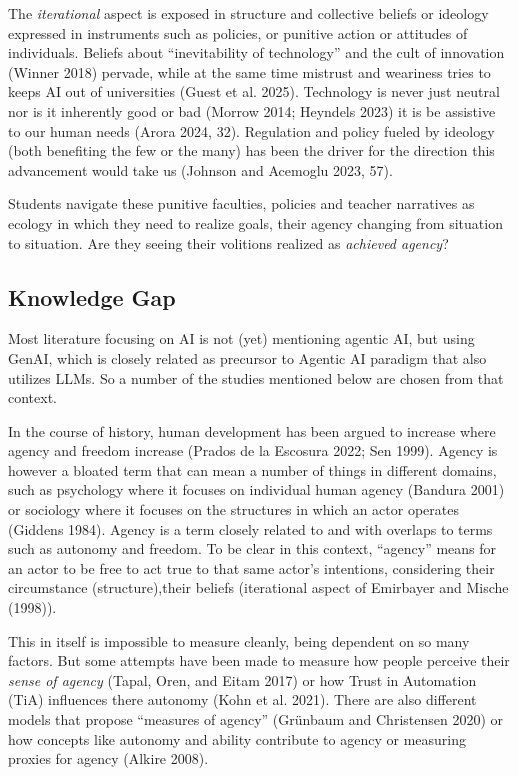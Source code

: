 \documentclass[
  letterpaper,
  DIV=11,
  numbers=noendperiod]{scrartcl}
\begin{document}
The \emph{iterational} aspect is exposed in structure and collective
beliefs or ideology expressed in instruments such as policies, or
punitive action or attitudes of individuals. Beliefs about
``inevitability of technology'' and the cult of innovation (Winner 2018)
pervade, while at the same time mistrust and weariness tries to keeps AI
out of universities (Guest et al. 2025). Technology is never just
neutral nor is it inherently good or bad (Morrow 2014; Heyndels 2023) it
is be assistive to our human needs (Arora 2024, 32). Regulation and
policy fueled by ideology (both benefiting the few or the many) has been
the driver for the direction this advancement would take us (Johnson and
Acemoglu 2023, 57).

Students navigate these punitive faculties, policies and teacher
narratives as ecology in which they need to realize goals, their agency
changing from situation to situation. Are they seeing their volitions
realized as \emph{achieved agency}?

\subsection{Knowledge Gap}\label{knowledge-gap}

Most literature focusing on AI is not (yet) mentioning agentic AI, but
using GenAI, which is closely related as precursor to Agentic AI
paradigm that also utilizes LLMs. So a number of the studies mentioned
below are chosen from that context.

In the course of history, human development has been argued to increase
where agency and freedom increase (Prados de la Escosura 2022; Sen
1999). Agency is however a bloated term that can mean a number of things
in different domains, such as psychology where it focuses on individual
human agency (Bandura 2001) or sociology where it focuses on the
structures in which an actor operates (Giddens 1984). Agency is a term
closely related to and with overlaps to terms such as autonomy and
freedom. To be clear in this context, ``agency'' means for an actor to
be free to act true to that same actor's intentions, considering their
circumstance (structure),their beliefs (iterational aspect of Emirbayer
and Mische (1998)).

This in itself is impossible to measure cleanly, being dependent on so
many factors. But some attempts have been made to measure how people
perceive their \emph{sense of agency} (Tapal, Oren, and Eitam 2017) or
how Trust in Automation (TiA) influences there autonomy (Kohn et al.
2021). There are also different models that propose ``measures of
agency'' (Grünbaum and Christensen 2020) or how concepts like autonomy
and ability contribute to agency or measuring proxies for agency (Alkire
2008).
\end{document}
